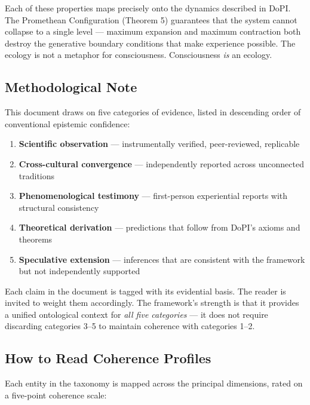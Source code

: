 Each of these properties maps precisely onto the dynamics described in DoPI. The Promethean Configuration (Theorem 5) guarantees that the system cannot collapse to a single level — maximum expansion and maximum contraction both destroy the generative boundary conditions that make experience possible. The ecology is not a metaphor for consciousness. Consciousness \textit{is} an ecology.


\subsection*{Methodological Note}


This document draws on five categories of evidence, listed in descending order of conventional epistemic confidence:


\begin{enumerate}[nosep,leftmargin=*]
  \item \textbf{Scientific observation} — instrumentally verified, peer-reviewed, replicable
  \item \textbf{Cross-cultural convergence} — independently reported across unconnected traditions
  \item \textbf{Phenomenological testimony} — first-person experiential reports with structural consistency
  \item \textbf{Theoretical derivation} — predictions that follow from DoPI's axioms and theorems
  \item \textbf{Speculative extension} — inferences that are consistent with the framework but not independently supported
\end{enumerate}


Each claim in the document is tagged with its evidential basis. The reader is invited to weight them accordingly. The framework's strength is that it provides a unified ontological context for \textit{all five categories} — it does not require discarding categories 3–5 to maintain coherence with categories 1–2.


\subsection*{How to Read Coherence Profiles}


Each entity in the taxonomy is mapped across the principal dimensions, rated on a five-point coherence scale:


